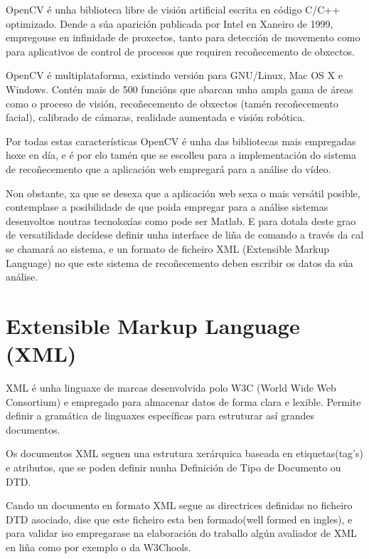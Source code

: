     OpenCV é unha biblioteca libre de visión artificial escrita en código C/C++ optimizado.
    Dende a súa aparición publicada por Intel en Xaneiro de 1999, empregouse en infinidade 
    de proxectos, tanto para detección de movemento como para aplicativos de control de procesos
    que requiren recoñecemento de obxectos.
    
    OpenCV é multiplataforma, existindo versión para GNU/Linux, Mac OS X e Windows. Contén mais 
    de 500 funcións que abarcan unha ampla gama de áreas como o proceso de visión, recoñecemento
    de obxectos (tamén recoñecemento facial), calibrado de cámaras, realidade aumentada e visión
    robótica.
    
    Por todas estas características OpenCV é unha das bibliotecas mais empregadas hoxe en día, e é
    por elo tamén que se escolleu para a implementación do sistema de recoñecemento que a aplicación
    web empregará para a análise do vídeo.
    
    Non obstante, xa que se desexa que a aplicación web sexa o mais versátil posible, contemplase a
    posibilidade de que poida empregar para a análise sistemas desenvoltos noutras tecnoloxías como
    pode ser Matlab. E para dotala deste grao de versatilidade decídese definir unha interface de
    liña de comando a través da cal se chamará ao sistema, e un formato de ficheiro XML (Extensible 
    Markup Language) no que este sistema de recoñecemento deben escribir os datos da súa análise.
        
\section{Extensible Markup Language (XML)}
    XML é unha linguaxe de marcas desenvolvida polo W3C (World Wide Web Consortium) e empregado
    para almacenar datos de forma clara e lexible. Permite definir a gramática de linguaxes 
    específicas para estruturar así grandes documentos.
    
    Os documentos XML seguen una estrutura xerárquica baseada en etiquetas(tag's) e atributos,
    que se poden definir nunha Definición de Tipo de Documento ou DTD. \cite{dtd-web-page}
    
    Cando un documento en formato XML segue as directrices definidas no ficheiro DTD asociado,
    dise que este ficheiro esta ben formado(well formed en ingles), e para validar iso empregarase
    na elaboración do traballo algún avaliador de XML en liña como por exemplo o da W3Chools.\cite{xml-validator}
    
